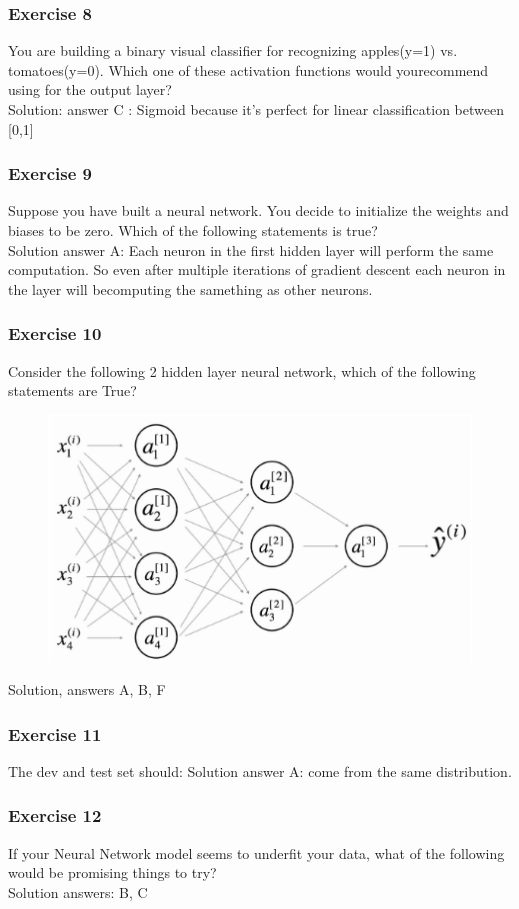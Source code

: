 \subsubsection*{Exercise 8}
You are building a binary visual classifier for recognizing apples(y=1) vs. tomatoes(y=0). Which one of these activation functions would yourecommend using for the output layer?
\\Solution: answer C : Sigmoid because it's perfect for linear classification between [0,1]
\subsubsection*{Exercise 9}
Suppose you have built a neural network. You decide to initialize the weights and biases to be zero. Which of the following statements is true?\\
Solution answer A: Each neuron in the first hidden layer will perform the same computation. So even after multiple iterations of gradient descent each neuron in the layer will becomputing the samething as other neurons.
\subsubsection*{Exercise 10}
Consider the following 2 hidden layer neural network, which of the following statements are True?
\begin{figure}[htbp]
    \centering
    \includegraphics[width=12cm]{ExerciseBook/01-NeuralNetwork/exercise10.png}\newline
\end{figure}
Solution, answers A, B, F
\subsubsection*{Exercise 11}
The dev and test set should:
Solution answer A: come from the same distribution.
\subsubsection*{Exercise 12}
If your Neural Network model seems to underfit your data, what of the following would be promising things to try?\\
Solution answers: B, C